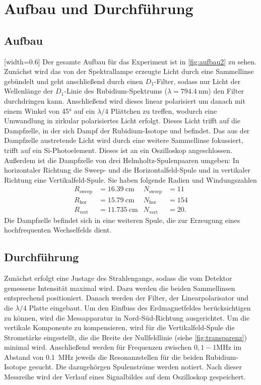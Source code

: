 \section {Aufbau und Durchführung}
\label{sec:durchführung}

\subsection{Aufbau}
[width=0.6\textwidth]
Der gesamte Aufbau für das Experiment ist in \autoref{fig:aufbau2} zu sehen. Zunächst wird das von der Spektrallampe erzeugte Licht durch eine Sammellinse gebündelt und geht anschließend durch einen $D_1$-Filter, sodass nur Licht der Wellenlänge der $D_1$-Linie des Rubidium-Spektrums ($\lambda = \SI{794,4}{\nano\meter}$) den Filter durchdringen kann. Anschließend wird dieses linear polarisiert um danach mit einem Winkel von 45° auf ein $\lambda/4$ Plättchen zu treffen, wodurch eine Umwandlung in zirkular polarisiertes Licht erfolgt. Dieses Licht trifft auf die Dampfzelle, in der sich Dampf der Rubidium-Isotope  und  befindet. Das aus der Dampfzelle austretende Licht wird durch eine weitere Sammellinse fokussiert, trifft auf ein Si-Photoelement. Dieses ist an ein Oszilloskop angeschlossen. Außerdem ist die Dampfzelle von drei Helmholtz-Spulenpaaren umgeben: In horizontaler Richtung die Sweep- und die Horizontalfeld-Spule und in vertikaler Richtung eine Vertikalfeld-Spule. Sie haben folgende Radien und Windungszahlen
\begin{align}
  R_\mathrm{sweep} &= \SI{16,39}{\centi\meter}& N_\mathrm{sweep} &= 11 \\
  R_\mathrm{hor} &= \SI{15,79}{\centi\meter} & N_\mathrm{hor} &= 154 \\
  R_\mathrm{vert} &= \SI{11,735}{\centi\meter} & N_\mathrm{vert} &= 20.
\end{align}
Die Dampfzelle befindet sich in eine weiteren Spule, die zur Erzeugung eines hochfrequenten Wechselfelds dient.

\subsection{Durchführung}
Zunächst erfolgt eine Justage des Strahlengangs, sodass die vom Detektor gemessene Intensität maximal wird. Dazu werden die beiden Sammellinsen entsprechend positioniert. Danach werden der Filter, der Linearpolarisator und die $\lambda/4$ Platte eingebaut.
Um den Einfluss des Erdmagnetfeldes berücksichtigen zu können, wird die Messapparatur in Nord-Süd-Richtung ausgerichtet. Um die vertikale Komponente zu kompensieren, wird für die Vertikalfeld-Spule die Stromstärke eingestellt, die die Breite der Nullfeldlinie (siehe \autoref{fig:transparenz}) minimal wird. Anschließend werden für Frequenzen zwischen $0,1-1\si{\mega\Hz}$ im Abstand von \SI{0,1}{\mega\Hz} jeweils die Resonanzstellen für die beiden Rubidium-Isotope gesucht. Die dazugehörgen Spulenströme werden notiert. Nach dieser Messreihe wird der Verlauf eines Signalbildes auf dem Oszilloskop gespeichert.
